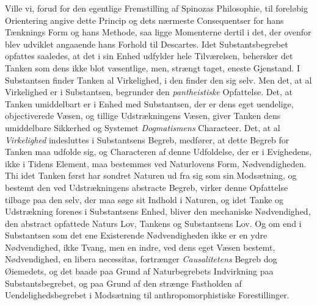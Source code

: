 \documentclass[12pt,a4paper]{book}
\newcommand{\opage}[1]{\marginnote{\footnotesize\textit{[#1]}}}
\begin{document}
Ville vi, forud for den egentlige Fremstilling af Spinozas Philosophie,
til foreløbig Orientering angive dette Princip og dets nærmeste
Consequentser for hans Tænknings Form og hans Methode, saa ligge
Momenterne dertil i det, der ovenfor blev udviklet angaaende hans Forhold
til Descartes. Idet Substantsbegrebet opfattes saaledes, at det i sin
Enhed udfylder hele Tilværelsen, behersker det Tanken som dens ikke blot
væsentlige, men, strængt taget, eneste
\opage{25} \setcounter{footnote}{0}%
Gjenstand. I Substantsen finder Tanken al Virkelighed, i den finder den
sig selv. Men det, at al Virkelighed er i Substantsen, begrunder den
\emph{pantheistiske} Opfattelse. Det, at Tanken umiddelbart er i Enhed
med Substantsen, der er dens eget uendelige, objectiverede Væsen, og
tillige Udstrækningens Væsen, giver Tanken dens umiddelbare Sikkerhed og
Systemet \emph{Dogmatismens} Characteer. Det, at al \emph{Virkelighed}
indesluttes i Substantsens Begreb, medfører, at dette Begreb for Tanken
maa udfolde sig, og Characteren af denne Udfoldelse, der er i Evighedens,
ikke i Tidens Element, maa bestemmes ved Naturlovens Form,
Nødvendigheden. Thi idet Tanken først har sondret Naturen ud fra sig som
sin Modsætning, og bestemt den ved Udstrækningens abstracte Begreb,
virker denne Opfattelse tilbage paa den selv, der maa søge sit Indhold i
Naturen, og idet Tanke og Udstrækning forenes i Substantsens Enhed,
bliver den mechaniske Nødvendighed, den abstract opfattede Naturs Lov,
Tankens og Substantsens Lov. Og om end i Substantsen som det ene
Existerende Nødvendigheden ikke er en ydre Nødvendighed, ikke Tvang, men
en indre, ved dens eget Væsen bestemt, Nødvendighed, en libera
necessitas, fortrænger \emph{Causalitetens} Begreb dog Øiemedets, og det
baade paa Grund af Naturbegrebets Indvirkning paa Substantsbegrebet, og
paa Grund af den strænge Fastholden af Uendelighedsbegrebet i Modsætning
til anthropomorphistiske Forestillinger.
\end{document}
